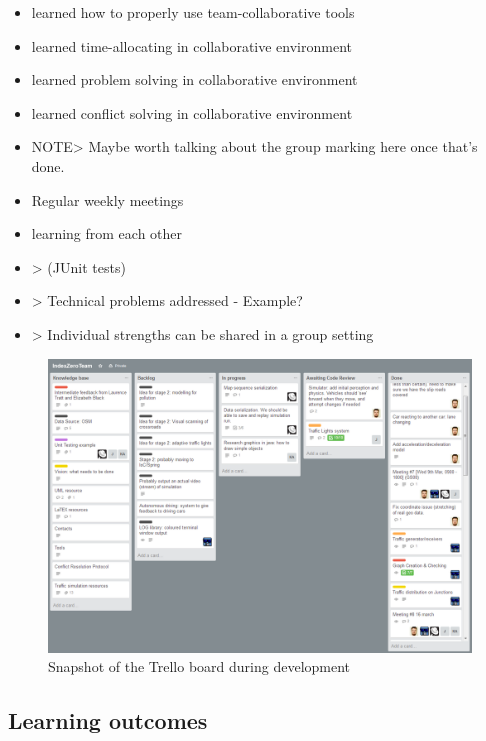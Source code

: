 \begin{itemize}
    \item learned how to properly use team-collaborative tools
    \item learned time-allocating in collaborative environment
    \item learned  problem solving in collaborative environment
    \item learned  conflict solving in collaborative environment
    \item NOTE> Maybe worth talking about the group marking here once that's done.
    \item Regular weekly meetings
    \item learning from each other
    \item > (JUnit tests)
    \item > Technical problems addressed - Example?
    \item > Individual strengths can be shared in a group setting
\end {itemize}

\begin{figure}[!h]
	\vspace{1.5em}
  	\caption{Snapshot of the Trello board during development}
  	\label{fig:trello}
  	\centering
	\includegraphics[width=1\textwidth]{figs/Tools/trello.png}
  	\vspace{1.5em}
\end{figure}


\subsection{Learning outcomes}


